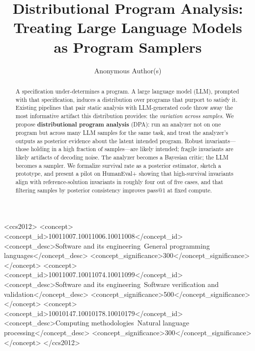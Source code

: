 \documentclass[sigconf,review,anonymous,nonacm]{acmart}
\begin{document}
\title{Distributional Program Analysis:\\
Treating Large Language Models as Program Samplers}

\author{Anonymous Author(s)}

\renewcommand{\shortauthors}{Anonymous}

\begin{abstract}
A specification under-determines a program. A large language model (LLM),
prompted with that specification, induces a distribution over programs
that purport to satisfy it. Existing pipelines that pair static analysis
with LLM-generated code throw away the most informative artifact this
distribution provides: the \emph{variation across samples}. We propose
\textbf{distributional program analysis} (DPA): run an analyzer not on
one program but across many LLM samples for the same task, and treat the
analyzer's outputs as posterior evidence about the latent intended
program. Robust invariants---those holding in a high fraction of
samples---are likely intended; fragile invariants are likely artifacts of
decoding noise. The analyzer becomes a Bayesian critic; the LLM becomes
a sampler. We formalize survival rate as a posterior estimator, sketch a
prototype, and present a pilot on HumanEval+ showing that high-survival
invariants align with reference-solution invariants in roughly four out
of five cases, and that filtering samples by posterior consistency
improves pass@1 at fixed compute.
\end{abstract}

\begin{CCSXML}
<ccs2012>
 <concept>
  <concept_id>10011007.10011006.10011008</concept_id>
  <concept_desc>Software and its engineering~General programming languages</concept_desc>
  <concept_significance>300</concept_significance>
 </concept>
 <concept>
  <concept_id>10011007.10011074.10011099</concept_id>
  <concept_desc>Software and its engineering~Software verification and validation</concept_desc>
  <concept_significance>500</concept_significance>
 </concept>
 <concept>
  <concept_id>10010147.10010178.10010179</concept_id>
  <concept_desc>Computing methodologies~Natural language processing</concept_desc>
  <concept_significance>300</concept_significance>
 </concept>
</ccs2012>
\end{CCSXML}

\end{document}
